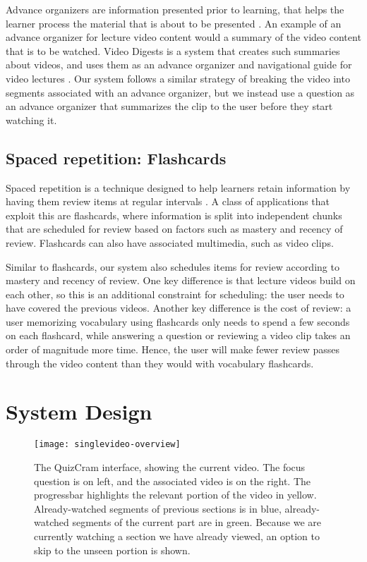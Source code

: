 \documentclass{sigchi}
\begin{document}
Advance organizers are information presented prior to learning, that helps the learner process the material that is about to be presented  \cite{advanceorganizers}. An example of an advance organizer for lecture video content would a summary of the video content that is to be watched. Video Digests is a system that creates such summaries about videos, and uses them as an advance organizer and navigational guide for video lectures \cite{videodigests}. Our system follows a similar strategy of breaking the video into segments associated with an advance organizer, but we instead use a question as an advance organizer that summarizes the clip to the user before they start watching it.

\subsection{Spaced repetition: Flashcards}

Spaced repetition is a technique designed to help learners retain information by having them review  items at regular intervals \cite{karpicke2011spaced}. A class of applications that exploit this are flashcards, where information is split into independent chunks that are scheduled for review based on factors such as mastery and recency of review. Flashcards can also have associated multimedia, such as video clips.

Similar to flashcards, our system also schedules items for review according to mastery and recency of review. One key difference is that lecture videos build on each other, so this is an additional constraint for scheduling: the user needs to have covered the previous videos. Another key difference is the cost of review: a user memorizing vocabulary using flashcards only needs to spend a few seconds on each flashcard, while answering a question or reviewing a video clip takes an order of magnitude more time. Hence, the user will make fewer review passes through the video content than they would with vocabulary flashcards.

\section{System Design}

\begin{figure}
\centering
\texttt{[image: singlevideo-overview]}
\caption{The QuizCram interface, showing the current video. The focus question is on left, and the associated video is on the right. The progressbar highlights the relevant portion of the video in yellow. Already-watched segments of previous sections is in blue, already-watched segments of the current part are in green. Because we are currently watching a section we have already viewed, an option to skip to the unseen portion is shown.}
\label{fig:figure1}
\end{figure}
\end{document}
